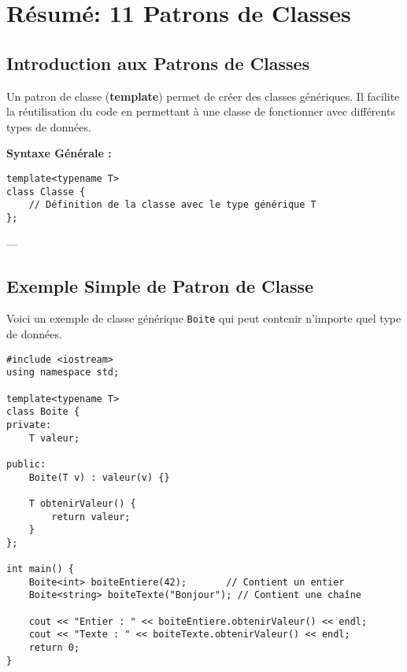 \section{ Résumé: 11 Patrons de Classes}

\subsection{ Introduction aux Patrons de Classes}
Un patron de classe (\textbf{template}) permet de créer des classes génériques. Il facilite la réutilisation du code en permettant à une classe de fonctionner avec différents types de données.

\textbf{Syntaxe Générale :}
\begin{tcolorbox}[colframe=blue!50!black, colback=blue!5!white, title=Syntaxe Générale des Templates]
\begin{verbatim}
template<typename T>
class Classe {
    // Définition de la classe avec le type générique T
};
\end{verbatim}
\end{tcolorbox}

---

\subsection{ Exemple Simple de Patron de Classe}
Voici un exemple de classe générique \texttt{Boite} qui peut contenir n'importe quel type de données.

\begin{tcolorbox}[colframe=blue!50!black, colback=blue!5!white, title=Exemple de Patron de Classe]
\begin{verbatim}
#include <iostream>
using namespace std;

template<typename T>
class Boite {
private:
    T valeur;

public:
    Boite(T v) : valeur(v) {}

    T obtenirValeur() {
        return valeur;
    }
};

int main() {
    Boite<int> boiteEntiere(42);       // Contient un entier
    Boite<string> boiteTexte("Bonjour"); // Contient une chaîne

    cout << "Entier : " << boiteEntiere.obtenirValeur() << endl;
    cout << "Texte : " << boiteTexte.obtenirValeur() << endl;
    return 0;
}
\end{verbatim}
\end{tcolorbox}


